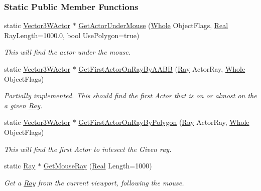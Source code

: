 \subsubsection*{Static Public Member Functions}
\begin{DoxyCompactItemize}
\item 
static \hyperlink{classMezzanine_1_1Vector3WActor}{Vector3WActor} $\ast$ \hyperlink{classMezzanine_1_1RayQueryTool_adddae3c56c5eba8af77e8d72e5c751bd}{GetActorUnderMouse} (\hyperlink{namespaceMezzanine_adcbb6ce6d1eb4379d109e51171e2e493}{Whole} ObjectFlags, \hyperlink{namespaceMezzanine_a726731b1a7df72bf3583e4a97282c6f6}{Real} RayLength=1000.0, bool UsePolygon=true)
\begin{DoxyCompactList}\small\item\em This will find the actor under the mouse. \item\end{DoxyCompactList}\item 
static \hyperlink{classMezzanine_1_1Vector3WActor}{Vector3WActor} $\ast$ \hyperlink{classMezzanine_1_1RayQueryTool_a9ded1647755a523d3dbda297a0e73eba}{GetFirstActorOnRayByAABB} (\hyperlink{classMezzanine_1_1Ray}{Ray} ActorRay, \hyperlink{namespaceMezzanine_adcbb6ce6d1eb4379d109e51171e2e493}{Whole} ObjectFlags)
\begin{DoxyCompactList}\small\item\em Partially implemented. This should find the first Actor that is on or almost on the a given \hyperlink{classMezzanine_1_1Ray}{Ray}. \item\end{DoxyCompactList}\item 
static \hyperlink{classMezzanine_1_1Vector3WActor}{Vector3WActor} $\ast$ \hyperlink{classMezzanine_1_1RayQueryTool_af1224419c58901fc57fcef2d236a8298}{GetFirstActorOnRayByPolygon} (\hyperlink{classMezzanine_1_1Ray}{Ray} ActorRay, \hyperlink{namespaceMezzanine_adcbb6ce6d1eb4379d109e51171e2e493}{Whole} ObjectFlags)
\begin{DoxyCompactList}\small\item\em This will find the first Actor to intesect the Given ray. \item\end{DoxyCompactList}\item 
static \hyperlink{classMezzanine_1_1Ray}{Ray} $\ast$ \hyperlink{classMezzanine_1_1RayQueryTool_ac1c1996e97e3c0ab739b112907ba6790}{GetMouseRay} (\hyperlink{namespaceMezzanine_a726731b1a7df72bf3583e4a97282c6f6}{Real} Length=1000)
\begin{DoxyCompactList}\small\item\em Get a \hyperlink{classMezzanine_1_1Ray}{Ray} from the current viewport, following the mouse. \item\end{DoxyCompactList}\item 

\end{DoxyCompactItemize}
